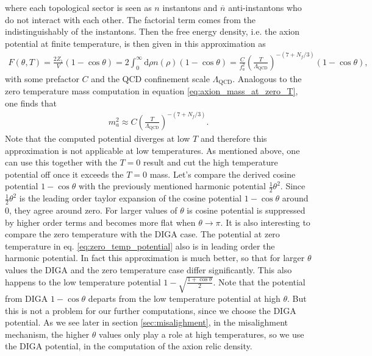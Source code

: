\documentclass[twoside,a4paper, 12pt]{article}
\newcommand{\diff}{\mathrm{d}}
\numberwithin{equation}{section}
\begin{document}
where each topological sector is seen as $n$ instantons and $\overline{n}$ anti-instantons who do not interact with each other.
The factorial term comes from the indistinguishably of the instantons.
Then the free energy density, i.e. the axion potential at finite temperature, is then given in this approximation as
\begin{align}
    \label{eq:diga_axion_potential}
    F(\theta, T) = \frac{2 Z_1}{V} (1 - \cos \theta) = 2 \int_0^\infty \diff \rho n(\rho) (1 - \cos \theta) 
    = \frac{C}{f_a^2} \left(\frac{T}{\Lambda_\mathrm{QCD}}\right)^{-(7 + N_f / 3)}(1 - \cos \theta),
\end{align}
with some prefactor $C$ and the QCD confinement scale $\Lambda_\mathrm{QCD}$.
Analogous to the zero temperature mass computation in equation \eqref{eq:axion_mass_at_zero_T}, one finds that 
\begin{align}
    \label{eq:axion_mass_diga}
    m_a^2 \approx C \left(\frac{T}{\Lambda_\mathrm{QCD}}\right)^{-(7 + N_f / 3)}.
\end{align}
Note that the computed potential diverges at low $T$ and therefore this approximation is not applicable at low temperatures. As
mentioned above, one can use this together with the $T = 0$ result and cut the high temperature potential
off once it exceeds the $T = 0$ mass.
Let's compare the derived cosine potential $1 - \cos \theta$ with the previously mentioned harmonic potential $\frac{1}{2} \theta^2$.
Since $\frac{1}{2}\theta^2$ is the
leading order taylor expansion of the cosine potential $1 - \cos \theta$ around 0, they agree around zero.
For larger values of $\theta$ is cosine potential is suppressed by higher order terms and becomes more flat when $\theta \rightarrow \pi$.
It is also interesting to compare the zero temperature with the DIGA case.
The potential at zero temperature in eq. \eqref{eq:zero_temp_potential} also is in leading order
the harmonic potential. In fact this approximation is much better, so that for larger $\theta$ values
the DIGA and the zero temperature case differ significantly.
This also happens to the low temperature potential $1 - \sqrt{\frac{1 + \cos \theta}{2}}$.
Note that the potential from DIGA $1 - \cos \theta$ departs from the low temperature potential
at high $\theta$.
But this is not a problem for our further computations, since we choose the DIGA potential.
As we see later in section \ref{sec:misalighment}, in the misalighment mechanism, the higher $\theta$ values only play a role at high temperatures, so we use the DIGA potential, in the computation of the axion relic density.
\end{document}
